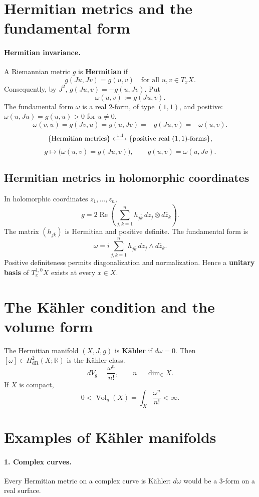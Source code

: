 \documentclass[11pt]{article}
\newcommand{\C}{\mathbb C}
\newcommand{\R}{\mathbb R}
\newcommand{\dR}{\mathrm{dR}}
\newcommand{\Vol}{\operatorname{Vol}}
\begin{document}
\section*{Hermitian metrics and the fundamental form}
\paragraph{Hermitian invariance.}
A Riemannian metric $g$ is \textbf{Hermitian} if
\[
 g(Ju,Jv)=g(u,v)\quad\text{for all }u,v\in T_xX.
\]
Consequently, by $J^2$, $g(Ju,v)=-g(u,Jv)$. Put
\[
 \omega(u,v):=g(Ju,v).
\]
The fundamental form $\omega$ is a real $2$-form, of type $(1,1)$,
and positive: $\omega(u,Ju)=g(u,u)>0$ for $u\neq0$.
\[
 \omega(v,u)=g(Jv,u)=g(u,Jv)=-g(Ju,v)=-\omega(u,v).
\]
\[
 \{\text{Hermitian metrics}\}
 \xleftrightarrow{\;1:1\;}
 \{\text{positive real $(1,1)$-forms}\},
\]
\[
 g\longmapsto\bigl(\omega(u,v)=g(Ju,v)\bigr),\qquad
 g(u,v)=\omega(u,Jv).
\]

\subsection*{Hermitian metrics in holomorphic coordinates}
In holomorphic coordinates $z_1,\ldots,z_n$,
\[
 g=2\operatorname{Re}\left(\sum_{j,k=1}^n
 h_{j\bar k}\,dz_j\otimes d\bar z_k\right).
\]
The matrix $(h_{j\bar k})$ is Hermitian and positive definite.
The fundamental form is
\[
 \omega=i\sum_{j,k=1}^n h_{j\bar k}\,dz_j\wedge d\bar z_k.
\]
Positive definiteness permits diagonalization and normalization.
Hence a \textbf{unitary basis} of $T_x^{1,0}X$ exists at every $x\in X$.

\section*{The K\"ahler condition and the volume form}
The Hermitian manifold $(X,J,g)$ is \textbf{K\"ahler} if $d\omega=0$.
Then $[\omega]\in H^2_{\dR}(X;\R)$ is the K\"ahler class.
\[
 dV_g=\frac{\omega^n}{n!},\qquad n=\dim_{\C}X.
\]
If $X$ is compact,
\[
 0<\Vol_g(X)=\int_X\frac{\omega^n}{n!}<\infty.
\]

\section*{Examples of K\"ahler manifolds}
\paragraph{1. Complex curves.}
Every Hermitian metric on a complex curve is K\"ahler:
$d\omega$ would be a $3$-form on a real surface.
\end{document}

